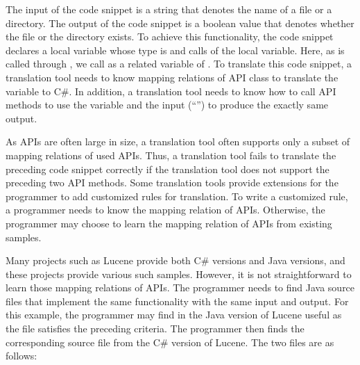 The input of the code snippet is a string that denotes the name of a
file or a directory. The output of the code snippet is a boolean
value that denotes whether the file or the directory exists. To
achieve this functionality, the code snippet declares a local
variable whose type is  and calls
 of the local variable. Here, as 
is called through , we call  as a related
variable of . To translate this code snippet, a
translation tool needs to know mapping relations of API class to
translate the variable  to C\#. In addition, a
translation tool needs to know how to call API methods to use the
variable and the input (``'') to produce the exactly
same output.

As APIs are often large in size, a translation tool often supports
only a subset of mapping relations of used APIs. Thus, a translation
tool fails to translate the preceding code snippet correctly if the
translation tool does not support the preceding two API methods.
Some translation tools provide extensions for the programmer to add
customized rules for translation. To write a customized rule, a
programmer needs to know the mapping relation of APIs. Otherwise,
the programmer may choose to learn the mapping relation of APIs from
existing samples.

Many projects such as Lucene provide both C\# versions and Java
versions, and these projects provide various such samples. However,
it is not straightforward to learn those mapping relations of APIs.
The programmer needs to find Java source files that implement the
same functionality with the same input and output. For this example,
the programmer may find  in the Java version
of Lucene useful as the file satisfies the preceding criteria. The
programmer then finds the corresponding source file
 from the C\# version of Lucene. The two files
are as follows:

